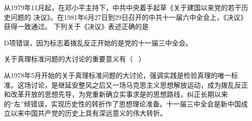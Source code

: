 \question 从1979年11月起，在邓小平主持下，中共中央着手起草《关于建国以来党的若干历史问题的
决议》。在1981年6月27日到29日召开的中共十一届六中全会上，《决议》获得一致通过。
下列关于《决议》表述正确的是
\par{}
\begin{solution}D项错误，因为标志着拨乱反正开始的是党的十一届三中全会。
\end{solution}
\question 关于真理标准问题的大讨论的重要意义有（ ~）
\par{}
\begin{solution}从1978年5月开始的关于真理标准问题的大讨论，强调实践是检验真理的唯一标准。这场讨论，是继延安整风之后又一场马克思主义思想解放运动，成为拨乱反正和改革开放的思想先导，为党重新确立实事求是的思想路线，纠正长期以来的``左''倾错误，实现历史性的转折作了思想理论准备。十一届三中全会是新中国成立以来中国共产党的历史上具有深远意义的伟大转折。
\end{solution}

